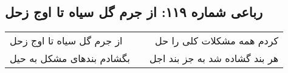 \begin{center}
\section*{رباعی شماره ۱۱۹: از جرم گل سیاه تا اوج زحل}
\label{sec:sh119}
\begin{longtable}{l p{0.5cm} r}
از جرم گل سیاه تا اوج زحل
&&
کردم همه مشکلات کلی را حل
\\
بگشادم بندهای مشکل به حیل
&&
هر بند گشاده شد به جز بند اجل
\\
\end{longtable}
\end{center}
